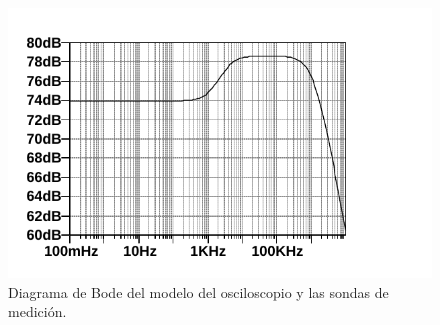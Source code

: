 \begin{figure}[!h]
    \centering
    \includegraphics[width=\columnwidth]{img/graphs/oscilloscope-probes-model-bode.pdf}
    \caption{Diagrama de Bode del modelo del osciloscopio y las sondas de medición.}
    \label{fig:oscilloscope-probes-model-bode}
\end{figure}